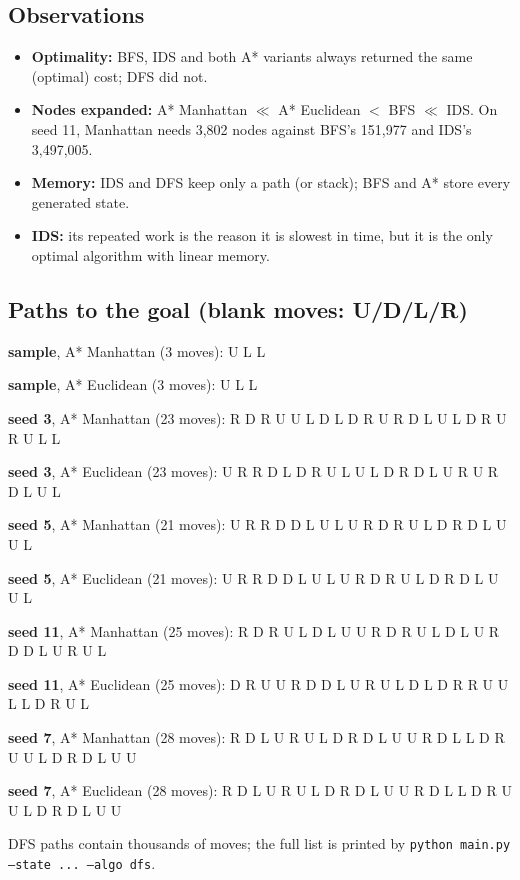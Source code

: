 \documentclass[11pt,a4paper]{article}
\begin{document}
\subsection{Observations}
\begin{itemize}
\item \textbf{Optimality:} BFS, IDS and both A* variants always returned the same (optimal) cost; DFS did not.
\item \textbf{Nodes expanded:} A* Manhattan $\ll$ A* Euclidean $<$ BFS $\ll$ IDS. On seed 11, Manhattan needs 3{,}802 nodes against BFS's 151{,}977 and IDS's 3{,}497{,}005.
\item \textbf{Memory:} IDS and DFS keep only a path (or stack); BFS and A* store every generated state.
\item \textbf{IDS:} its repeated work is the reason it is slowest in time, but it is the only optimal algorithm with linear memory.
\end{itemize}

\subsection{Paths to the goal (blank moves: U/D/L/R)}
{\small
\textbf{sample}, A* Manhattan (3 moves): U L L\par\smallskip
\textbf{sample}, A* Euclidean (3 moves): U L L\par\smallskip
\textbf{seed 3}, A* Manhattan (23 moves): R D R U U L D L D R U R D L U L D R U R U L L\par\smallskip
\textbf{seed 3}, A* Euclidean (23 moves): U R R D L D R U L U L D R D L U R U R D L U L\par\smallskip
\textbf{seed 5}, A* Manhattan (21 moves): U R R D D L U L U R D R U L D R D L U U L\par\smallskip
\textbf{seed 5}, A* Euclidean (21 moves): U R R D D L U L U R D R U L D R D L U U L\par\smallskip
\textbf{seed 11}, A* Manhattan (25 moves): R D R U L D L U U R D R U L D L U R D D L U R U L\par\smallskip
\textbf{seed 11}, A* Euclidean (25 moves): D R U U R D D L U R U L D L D R R U U L L D R U L\par\smallskip
\textbf{seed 7}, A* Manhattan (28 moves): R D L U R U L D R D L U U R D L L D R U U L D R D L U U\par\smallskip
\textbf{seed 7}, A* Euclidean (28 moves): R D L U R U L D R D L U U R D L L D R U U L D R D L U U\par\smallskip

DFS paths contain thousands of moves; the full list is printed by \texttt{python main.py --state ... --algo dfs}.}
\end{document}
